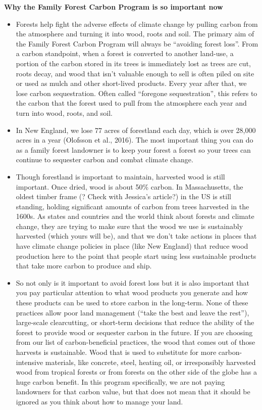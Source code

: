 \documentclass{article}\usepackage[]{graphicx}\usepackage[]{color}
\begin{document}
{\Large{\textbf{Why the Family Forest Carbon Program is so important now}}}

  \begin{itemize}
  \item Forests help fight the adverse effects of climate change by pulling carbon from the atmosphere and turning it into wood, roots and soil. The primary aim of the Family Forest Carbon Program will always be ``avoiding forest loss''. From a carbon standpoint, when a forest is converted to another land-use, a portion of the carbon stored in its trees is immediately lost as trees are cut, roots decay, and wood that isn't valuable enough to sell is often piled on site or used as mulch and other short-lived products. Every year after that, we lose carbon sequestration. Often called ``foregone sequestration'', this refers to the carbon that the forest used to pull from the atmosphere each year and turn into wood, roots, and soil.
  
  \item In New England, we lose 77 acres of forestland each day, which is over 28,000 acres in a year (Olofsson et al., 2016). The most important thing you can do as a family forest landowner is to keep your forest a forest so your trees can continue to sequester carbon and combat climate change.

  \item Though forestland is important to maintain, harvested wood is still important. Once dried, wood is about 50\% carbon. In Massachusetts, the oldest timber frame (? Check with Jessica's article?) in the US is still standing, holding significant amounts of carbon from trees harvested in the 1600s. As states and countries and the world think about forests and climate change, they are trying to make sure that the wood we use is sustainably harvested (which yours will be), and that we don't take actions in places that have climate change policies in place (like New England) that reduce wood production here to the point that people start using less sustainable products that take more carbon to produce and ship.

  \item So not only is it important to avoid forest loss but it is also important that you pay particular attention to what wood products you generate and how these products can be used to store carbon in the long-term. None of these practices allow poor land management (``take the best and leave the rest''), large-scale clearcutting, or short-term decisions that reduce the ability of the forest to provide wood or sequester carbon in the future. If you are choosing from our list of carbon-beneficial practices, the wood that comes out of those harvests is sustainable. Wood that is used to substitute for more carbon-intensive materials, like concrete, steel, heating oil, or irresponsibly harvested wood from tropical forests or from forests on the other side of the globe has a huge carbon benefit. In this program specifically, we are not paying landowners for that carbon value, but that does not mean that it should be ignored as you think about how to manage your land.


\end{itemize}
\end{document}
